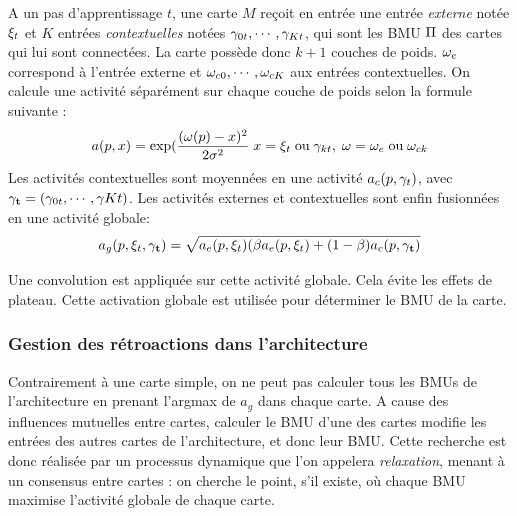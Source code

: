 A un pas d'apprentissage $t$, une carte $M$ reçoit en entrée une entrée \emph{externe} notée $\xi_t$ et $K$ entrées \emph{contextuelles} notées $\gamma_{0t},\cdots,\gamma_{Kt}$, qui sont les BMU $\Pi$ des cartes qui lui sont connectées. La carte possède donc $k+1$ couches de poids. $\omega_e$ correspond à l'entrée externe et $\omega_{c0}, \cdots, \omega_{cK}$ aux entrées contextuelles. On calcule une activité séparément sur chaque couche de poids selon la formule suivante : 
\begin{equation}
\label{eq:activite}
a(p,x) = \exp(\frac{(\omega(p)-x)^2}{2\sigma^2} \; x = \xi_t\; \text{ou}\; \gamma_{kt}, \; \omega = \omega_e \;\text{ou}\; \omega_{ck}
\end{equation}
Les activités contextuelles sont moyennées en une activité $a_c(p,\mathbf{\gamma}_t)$, avec $\mathbf{\gamma_t} = (\gamma_{0t}, \cdots, \gamma{Kt})$. 
Les activités externes et contextuelles sont enfin fusionnées en une activité globale:
\begin{equation}
\label{eq:global_act}
a_g(p,\xi_t,\mathbf{\gamma_t}) = \sqrt{a_e(p,\xi_t)(\beta a_e(p,\xi_t) + (1-\beta) a_c(p, \mathbf{\gamma_t})}
\end{equation}

Une convolution est appliquée sur cette activité globale. Cela évite les effets de plateau.
Cette activation globale est utilisée pour déterminer le BMU de la carte. 

\subsubsection{Gestion des rétroactions dans l'architecture}

Contrairement à une carte simple, on ne peut pas calculer tous les BMUs de l'architecture en prenant l'argmax de $a_g$ dans chaque carte. A cause des influences mutuelles entre cartes, calculer le BMU d'une des cartes modifie les entrées des autres cartes de l'architecture, et donc leur BMU. Cette recherche est donc réalisée par un processus dynamique que l'on appelera \emph{relaxation}, menant à un consensus entre cartes : on cherche le point, s'il existe, où chaque BMU maximise l'activité globale de chaque carte.

